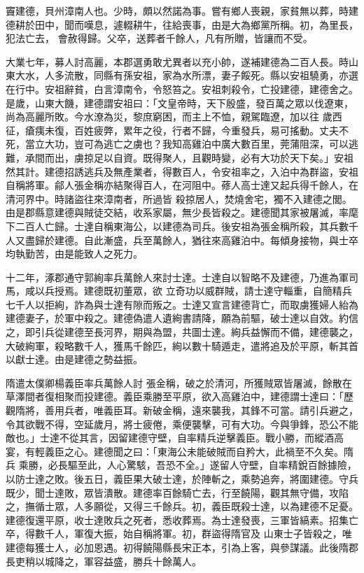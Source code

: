 \begin{pinyinscope}
 竇建德，貝州漳南人也。少時，頗以然諾為事。嘗有鄉人喪親，家貧無以葬，時建德耕於田中，聞而嘆息，遽輟耕牛，往給喪事，由是大為鄉黨所稱。初，為里長，犯法亡去，
 會赦得歸。父卒，送葬者千餘人，凡有所贈，皆讓而不受。



 大業七年，募人討高麗，本郡選勇敢尤異者以充小帥，遂補建德為二百人長。時山東大水，人多流散，同縣有孫安祖，家為水所漂，妻子餒死。縣以安祖驍勇，亦選在行中。安祖辭貧，白言漳南令，令怒笞之。安祖刺殺令，亡投建德，建德舍之。是歲，山東大饑，建德謂安祖曰：「文皇帝時，天下殷盛，發百萬之眾以伐遼東，尚為高麗所敗。今水潦為災，黎庶窮困，而主上不恤，親駕臨遼，加以往
 歲西征，瘡痍未復，百姓疲弊，累年之役，行者不歸，今重發兵，易可搖動。丈夫不死，當立大功，豈可為逃亡之虜也？我知高雞泊中廣大數百里，莞蒲阻深，可以逃難，承間而出，虜掠足以自資。既得聚人，且觀時變，必有大功於天下矣。」安祖然其計。建德招誘逃兵及無產業者，得數百人，令安祖率之，入泊中為群盜，安祖自稱將軍。鄃人張金稱亦結聚得百人，在河阻中。蓚人高士達又起兵得千餘人，在清河界中。時諸盜往來漳南者，所過皆
 殺掠居人，焚燒舍宅，獨不入建德之閭。由是郡縣意建德與賊徒交結，收系家屬，無少長皆殺之。建德聞其家被屠滅，率麾下二百人亡歸。士達自稱東海公，以建德為司兵。後安祖為張金稱所殺，其兵數千人又盡歸於建德。自此漸盛，兵至萬餘人，猶往來高雞泊中。每傾身接物，與士卒均執勤苦，由是能致人之死力。



 十二年，涿郡通守郭絢率兵萬餘人來討士達。士達自以智略不及建德，乃進為軍司馬，咸以兵授焉。建德既初董眾，欲
 立奇功以威群賊，請士達守輜重，自簡精兵七千人以拒絢，詐為與士達有隙而叛之。士達又宣言建德背亡，而取虜獲婦人紿為建德妻子，於軍中殺之。建德偽遣人遺絢書請降，願為前驅，破士達以自效。約信之，即引兵從建德至長河界，期與為盟，共圖士達。絢兵益懈而不備，建德襲之，大破絢軍，殺略數千人，獲馬千餘匹，絢以數十騎遁走，遣將追及於平原，斬其首以獻士達。由是建德之勢益振。



 隋遣太僕卿楊義臣率兵萬餘人討
 張金稱，破之於清河，所獲賊眾皆屠滅，餘散在草澤間者復相聚而投建德。義臣乘勝至平原，欲入高雞泊中，建德謂士達曰：「歷觀隋將，善用兵者，唯義臣耳。新破金稱，遠來襲我，其鋒不可當。請引兵避之，令其欲戰不得，空延歲月，將士疲倦，乘便襲擊，可有大功。今與爭鋒，恐公不能敵也。」士達不從其言，因留建德守壁，自率精兵逆擊義臣。戰小勝，而縱酒高宴，有輕義臣之心。建德聞之曰：「東海公未能破賊而自矜大，此禍至不久矣。隋兵
 乘勝，必長驅至此，人心驚駭，吾恐不全。」遂留人守壁，自率精銳百餘據險，以防士達之敗。後五日，義臣果大破士達，於陣斬之，乘勢追奔，將圍建德。守兵既少，聞士達敗，眾皆潰散。建德率百餘騎亡去，行至饒陽，觀其無守備，攻陷之，撫循士眾，人多願從，又得三千餘兵。初，義臣既殺士達，以為建德不足憂。建德復還平原，收士達敗兵之死者，悉收葬焉。為士達發喪，三軍皆縞素。招集亡卒，得數千人，軍復大振，始自稱將軍。初，群盜得隋官及
 山東士子皆殺之，唯建德每獲士人，必加恩遇。初得饒陽縣長宋正本，引為上客，與參謀議。此後隋郡長吏稍以城降之，軍容益盛，勝兵十餘萬人。




\end{pinyinscope}
